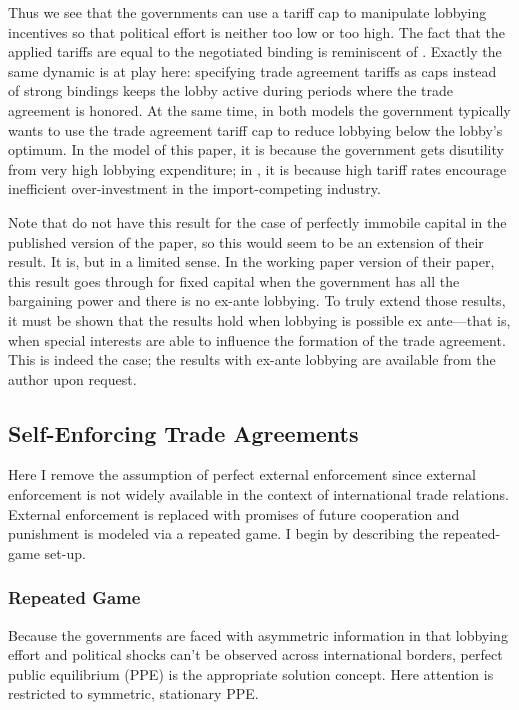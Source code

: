 \documentclass[12pt,titlepage]{article}
\begin{document}
Thus we see that the governments can use a tariff cap to manipulate lobbying incentives so that political effort is neither too low or too high. The fact that the applied tariffs are equal to the negotiated binding is reminiscent of \Textcite{mrc2007}. Exactly the same dynamic is at play here: specifying trade agreement tariffs as caps instead of strong bindings keeps the lobby active during periods where the trade agreement is honored. At the same time, in both models the government typically wants to use the trade agreement tariff cap to reduce lobbying below the lobby's optimum. In the model of this paper, it is because the government gets disutility from very high lobbying expenditure; in \Textcite{mrc2007}, it is because high tariff rates encourage inefficient over-investment in the import-competing industry.

Note that \Textcite{mrc2007} do not have this result for the case of perfectly immobile capital in the published version of the paper, so this would seem to be an extension of their result. It is, but in a limited sense. In the working paper version of their paper, this result goes through for fixed capital when the government has all the bargaining power and there is no ex-ante lobbying. To truly extend those results, it must be shown that the results hold when lobbying is possible ex ante---that is, when special interests
 are able to influence the formation of the trade agreement. This is indeed the case; the results with ex-ante lobbying are available from the author upon request.

					
	
\subsection{Self-Enforcing Trade Agreements}
\label{sec:self}
Here I remove the assumption of perfect external enforcement since external enforcement is not widely available in the context of international trade relations. External enforcement is replaced with promises of future cooperation and punishment is modeled via a repeated game. I begin by describing the repeated-game set-up. 

\subsubsection{Repeated Game}
Because the governments are faced with asymmetric information in that lobbying effort and political shocks can't be observed across international borders, perfect public equilibrium (PPE) is the appropriate solution concept. Here attention is restricted to symmetric, stationary PPE.
	
\end{document}
